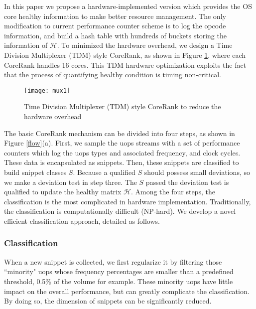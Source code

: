 In this paper we propose a hardware-implemented version which provides the OS core healthy information to make better resource management.  The only modification to current performance counter scheme is to log the opcode information, and build a hash table with hundreds of buckets storing the information of $\mathcal{H}$. To minimized the hardware overhead, we design a Time Division Multiplexer (TDM) style CoreRank, as shown in Figure \ref{mux}, where each CoreRank handles 16 cores.  This TDM hardware optimization exploits the fact that the process of quantifying healthy condition is timing non-critical.

\begin{figure}[t]
  \centering
  \texttt{[image: mux1]}\\
  \caption{Time Division Multiplexer (TDM) style CoreRank to reduce the hardware overhead}\label{mux}
\end{figure}

The basic CoreRank mechanism can be divided into four steps, as shown in Figure \ref{flow}(a). First, we sample the uops streams with a set of performance counters which log the uops types and associated frequency, and clock cycles. These data is encapsulated as snippets.  Then, these snippets are classified to build snippet classes $S$. Because a qualified $S$ should possess small deviations, so we make a deviation test in step three. The $S$ passed the deviation test is qualified to update the healthy matrix $\mathcal{H}$.  Among the four steps, the classification is the most complicated in hardware implementation.  Traditionally, the classification is computationally difficult (NP-hard). We develop a novel efficient classification approach, detailed as follows.

\subsubsection{Classification}
When a new snippet is collected, we first regularize it by filtering those ``minority" uops whose frequency percentages are smaller than a predefined threshold, 0.5\% of the volume for example. These minority uops have little impact on the overall performance, but can greatly complicate the classification. By doing so, the dimension of snippets can be significantly reduced.

